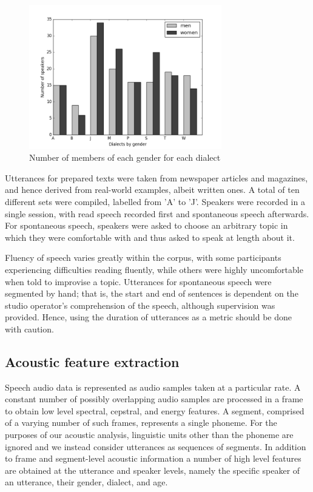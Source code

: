 \documentclass[conference]{IEEEtran}
\begin{document}
\begin{figure}[!htb]
\centering
\includegraphics[width=3.3in]{demograph}
\caption{Number of members of each gender for each dialect}
\label{demographics1}
\end{figure}

Utterances for prepared texts were taken from newspaper articles and magazines, and hence derived from real-world examples, albeit written ones.
A total of ten different sets were compiled, labelled from 'A' to 'J'.
Speakers were recorded in a single session, with read speech recorded first and spontaneous speech afterwards.
For spontaneous speech, speakers were asked to choose an arbitrary topic in which they were comfortable with and thus asked to speak at length about it.

Fluency of speech varies greatly within the corpus, with some participants experiencing difficulties reading fluently, while others were highly uncomfortable when told to improvise a topic.
Utterances for spontaneous speech were segmented by hand; that is, the start and end of sentences is dependent on the studio operator's comprehension of the speech, although supervision was provided.
Hence, using the duration of utterances as a metric should be done with caution.

\subsection{Acoustic feature extraction}

Speech audio data is represented as audio samples taken at a particular rate.
A constant number of possibly overlapping audio samples are processed in a frame to obtain low level spectral, cepstral, and energy features.
A segment, comprised of a varying number of such frames, represents a single phoneme.
For the purposes of our acoustic analysis, linguistic units other than the phoneme are ignored and we instead consider utterances as sequences of segments.
In addition to frame and segment-level acoustic information a number of high level features are obtained at the utterance and speaker levels, namely the specific speaker of an utterance, their gender, dialect, and age.
\end{document}
